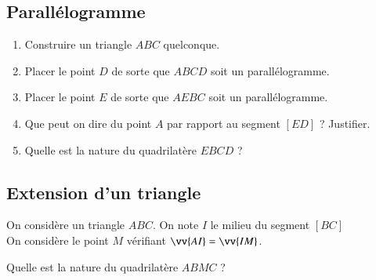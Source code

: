 \documentclass[oneside,12pt]{article}          %
\begin{document}
\subsection{Parallélogramme}
\begin{enumerate}
	\item Construire un triangle $ABC$ quelconque.
	\item Placer le point $D$ de sorte que $ABCD$ soit un parallélogramme.
	\item Placer le point $E$ de sorte que $AEBC$ soit un parallélogramme.
	\item Que peut on dire du point $A$ par rapport au segment $[ED]$ ? Justifier.
	\item Quelle est la nature du quadrilatère $EBCD$ ?
\end{enumerate}



\subsection{Extension d'un triangle}
On considère un triangle $ABC$. On note $I$ le milieu du segment $[BC]$ \\
On considère le point $M$ vérifiant $\vv{AI}=\vv{IM}$. 

Quelle est la nature du quadrilatère $ABMC$ ?
\end{document}
